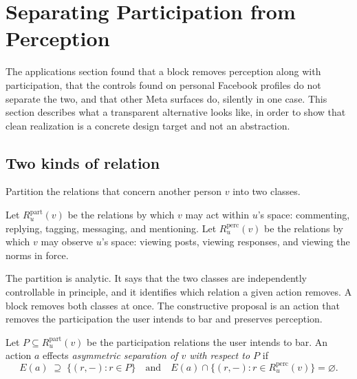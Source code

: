 
\section{Separating Participation from Perception}\label{sec:moderation}

The applications section found that a block removes perception along with participation, that the controls found on personal Facebook profiles do not separate the two, and that other Meta surfaces do, silently in one case. This section describes what a transparent alternative looks like, in order to show that clean realization is a concrete design target and not an abstraction.

\subsection{Two kinds of relation}

Partition the relations that concern another person $v$ into two classes.

\begin{definition}
Let $R_u^{\mathrm{part}}(v)$ be the relations by which $v$ may act within $u$'s space: commenting, replying, tagging, messaging, and mentioning. Let $R_u^{\mathrm{perc}}(v)$ be the relations by which $v$ may observe $u$'s space: viewing posts, viewing responses, and viewing the norms in force.
\end{definition}

The partition is analytic. It says that the two classes are independently controllable in principle, and it identifies which relation a given action removes. A block removes both classes at once. The constructive proposal is an action that removes the participation the user intends to bar and preserves perception.

\begin{definition}
Let $P\subseteq R_u^{\mathrm{part}}(v)$ be the participation relations the user intends to bar. An action $a$ effects \emph{asymmetric separation of $v$ with respect to $P$} if
\[
E(a)\;\supseteq\;\{(r,-) : r\in P\}
\quad\text{and}\quad
E(a)\cap\{(r,-): r\in R_u^{\mathrm{perc}}(v)\}=\varnothing .
\]
\end{definition}

